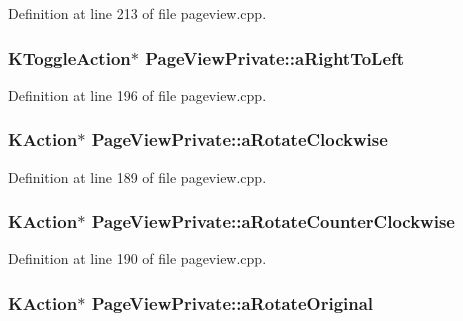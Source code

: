 Definition at line 213 of file pageview.\+cpp.

\hypertarget{classPageViewPrivate_a4f801cbeb2d2c5bb5cccd84f373aeec9}{
\subsubsection[{a\+Right\+To\+Left}]{\setlength{\rightskip}{0pt plus 5cm}K\+Toggle\+Action$\ast$ Page\+View\+Private\+::a\+Right\+To\+Left}}\label{classPageViewPrivate_a4f801cbeb2d2c5bb5cccd84f373aeec9}


Definition at line 196 of file pageview.\+cpp.

\hypertarget{classPageViewPrivate_a389103a18e7590c8ec75c26e23806e51}{
\subsubsection[{a\+Rotate\+Clockwise}]{\setlength{\rightskip}{0pt plus 5cm}K\+Action$\ast$ Page\+View\+Private\+::a\+Rotate\+Clockwise}}\label{classPageViewPrivate_a389103a18e7590c8ec75c26e23806e51}


Definition at line 189 of file pageview.\+cpp.

\hypertarget{classPageViewPrivate_a4a8b7b626080698fa1dbf78d60cbff59}{
\subsubsection[{a\+Rotate\+Counter\+Clockwise}]{\setlength{\rightskip}{0pt plus 5cm}K\+Action$\ast$ Page\+View\+Private\+::a\+Rotate\+Counter\+Clockwise}}\label{classPageViewPrivate_a4a8b7b626080698fa1dbf78d60cbff59}


Definition at line 190 of file pageview.\+cpp.

\hypertarget{classPageViewPrivate_ae57bd1f37889d8a28535e877c2fa87ed}{
\subsubsection[{a\+Rotate\+Original}]{\setlength{\rightskip}{0pt plus 5cm}K\+Action$\ast$ Page\+View\+Private\+::a\+Rotate\+Original}}\label{classPageViewPrivate_ae57bd1f37889d8a28535e877c2fa87ed}


